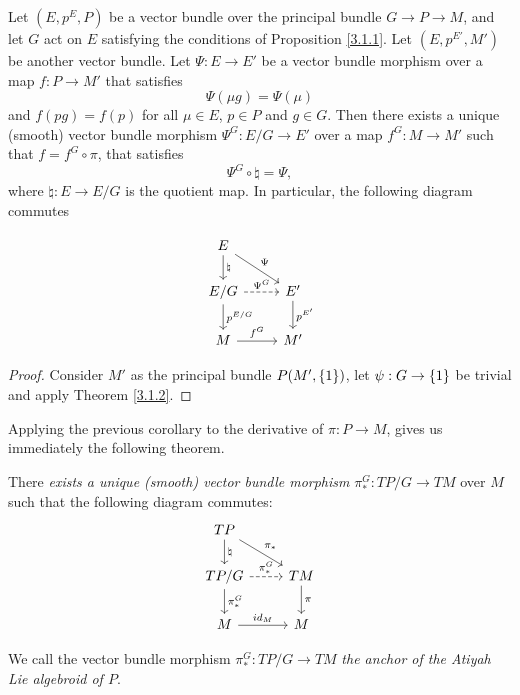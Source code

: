 \begin{corollary}
Let $(E, p^E, P)$ be a vector bundle over the principal bundle $G \to P \to M$, and let $G$ act on $E$ satisfying the conditions of Proposition \ref{3.1.1}. Let $(E, p^{E'}, M')$ be another vector bundle. Let $\Psi: E \to E'$ be a vector bundle morphism over a map $f: P \to M'$ that satisfies \[\Psi(\mu g) = \Psi(\mu)\] and $f(pg) = f(p)$ for all $\mu \in E$, $p \in P$ and $g \in G$. Then there exists a unique (smooth) vector bundle morphism $\Psi^{G}: E/G \to E'$ over a map $f^{G}: M \to M'$ such that $f = f^{G} \circ \pi$, that satisfies \[\Psi^{G} \circ \natural = \Psi,\] where $\natural: E \to E/G$ is the quotient map. In particular, the following diagram commutes

\begin{equation} \label{anchorDiagram}
    \begin{tikzcd}
    E \arrow[]{d}{\natural} \arrow[]{dr}{\Psi}& \\
    E/G \arrow[dashed]{r}{\Psi^{G}} \arrow[]{d}{p^{E/G}}& E' \arrow[]{d}{p^{E'}} \\
    M \arrow[]{r}{f^{G}} & M'
    \end{tikzcd}
\end{equation}
\end{corollary}

\begin{proof}
Consider $M'$ as the principal bundle $P(M', \left\{ 1 \right\})$, let $\psi:G \to \left\{ 1 \right\}$ be trivial and apply Theorem \ref{3.1.2}.
\end{proof}

Applying the previous corollary to the derivative of $\pi: P \to M$, gives us immediately the following theorem.

\begin{theorem}\label{anchorAtiyah}
There \emph{exists a unique (smooth) vector bundle morphism} $\pi_*^G: TP/G \to TM$ over $M$ such that the following diagram commutes:
\begin{equation} \label{anchorDiagram}
    \begin{tikzcd}
    TP \arrow[]{d}{\natural} \arrow[]{dr}{\pi_*}& \\
    TP/G \arrow[dashed]{r}{\pi^G_*} \arrow[]{d}{\pi_*^G}& TM \arrow[]{d}{\pi} \\
    M \arrow[]{r}{id_M} & M
    \end{tikzcd}
\end{equation}

We call the vector bundle morphism $\pi^G_*:TP/G \to TM$ \emph{the anchor of the Atiyah Lie algebroid of $P$}.
\end{theorem}


